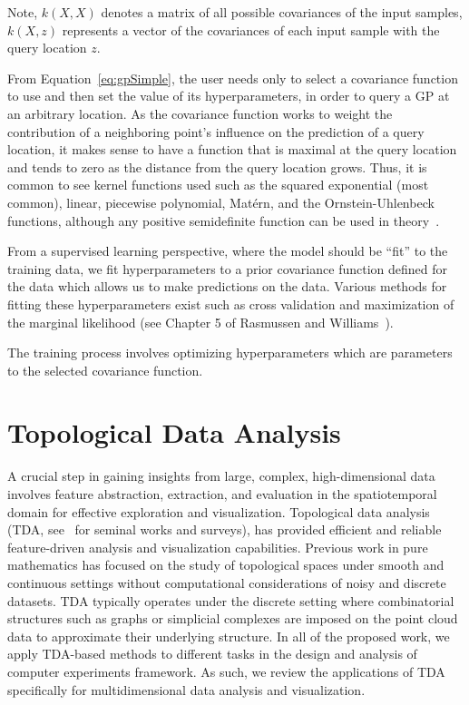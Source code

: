Note, $k(X,X)$ denotes a matrix of all possible covariances of the input samples, $k(X,z)$ represents a vector of the covariances of each input sample with the query location $z$.

From Equation~\ref{eq:gpSimple}, the user needs only to select a covariance function to use and then set the value of its hyperparameters, in order to query a GP at an arbitrary location.
%
As the covariance function works to weight the contribution of a neighboring point's influence on the prediction of a query location, it makes sense to have a function that is maximal at the query location and tends to zero as the distance from the query location grows.
%
Thus, it is common to see kernel functions used such as the squared exponential (most common), linear, piecewise polynomial, Mat\'{e}rn, and the Ornstein-Uhlenbeck functions, although any positive semidefinite function can be used in theory~\cite{RasmussenWilliams2006}.

From a supervised learning perspective, where the model should be ``fit'' to the training data, we fit hyperparameters to a prior covariance function defined for the data which allows us to make predictions on the data.
%
Various methods for fitting these hyperparameters exist such as cross validation and maximization of the marginal likelihood (see Chapter 5 of Rasmussen and Williams~\cite{RasmussenWilliams2006}).

The training process involves optimizing hyperparameters which are parameters to the selected covariance function.

\section{Topological Data Analysis}
A crucial step in gaining insights from large, complex, high-dimensional data involves feature abstraction, extraction, and evaluation in the spatiotemporal domain for effective exploration and visualization.
%
Topological data analysis (TDA, see~\cite{EdsbrunnerHarer2010,Zomorodian2005,BiasottisDeFlorianiFalcidieno2008,Carlsson2009,EdelsbrunnerHarer2008,Ghrist2009} for seminal works and surveys), has provided efficient and reliable feature-driven analysis and visualization capabilities.
%
Previous work in pure mathematics has focused on the study of topological spaces under smooth and continuous settings without computational considerations of noisy and discrete datasets.
%
TDA typically operates under the discrete setting where combinatorial structures such as graphs or simplicial complexes are imposed on the point cloud data to approximate their underlying structure.
%
In all of the proposed work, we apply TDA-based methods to different tasks in the design and analysis of computer experiments framework.
%
As such, we review the applications of TDA specifically for multidimensional data analysis and visualization.

